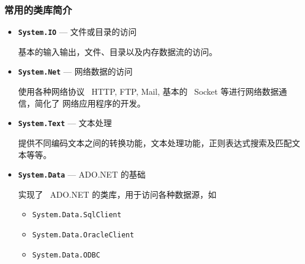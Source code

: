 \begin{frame}
\frametitle{常用的类库简介}
\begin{itemize}
  \CJKindent
\item \texttt{\textbf{System.IO}} --- 文件或目录的访问    \smallskip

  \small 基本的输入输出，文件、目录以及内存数据流的访问。
  \smallskip
\pause
\item \texttt{\textbf{System.Net}} --- 网络数据的访问    \smallskip

  \small 使用各种网络协议 ~HTTP, FTP, Mail, 基本的 ~Socket 等进行网络数据通信，简化了
  网络应用程序的开发。
  \smallskip
\pause
\item \texttt{\textbf{System.Text}} --- 文本处理    \smallskip

  \small 提供不同编码文本之间的转换功能，文本处理功能，正则表达式搜索及匹配文本等等。
  \smallskip
\pause
\item \texttt{\textbf{System.Data}} --- ADO.NET 的基础    \smallskip

  \small 实现了 ~ADO.NET 的类库，用于访问各种数据源，如
  \begin{itemize}
  \item \texttt{System.Data.SqlClient}
  \item \texttt{System.Data.OracleClient}
  \item \texttt{System.Data.ODBC}
  \end{itemize}
  \smallskip


\end{itemize}
\end{frame}


